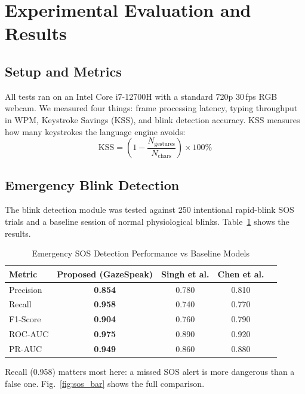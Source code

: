 \documentclass[conference]{IEEEtran}
\begin{document}
\section{Experimental Evaluation and Results}

\subsection{Setup and Metrics}
All tests ran on an Intel Core i7-12700H with a standard 720p 30\,fps RGB webcam. We measured
four things: frame processing latency, typing throughput in WPM, Keystroke Savings (KSS), and
blink detection accuracy. KSS measures how many keystrokes the language engine avoids:
\begin{equation}
\text{KSS} = \left(1 - \frac{N_{\text{gestures}}}{N_{\text{chars}}} \right) \times 100\%
\end{equation}

\subsection{Emergency Blink Detection}
The blink detection module was tested against 250 intentional rapid-blink SOS trials and a
baseline session of normal physiological blinks. Table~\ref{tab:sota_metrics} shows the results.

\begin{table}[htbp]
\caption{Emergency SOS Detection Performance vs Baseline Models}
\label{tab:sota_metrics}
\centering
\begin{tabular}{lcccc}
\toprule
\textbf{Metric} & \textbf{Proposed (GazeSpeak)} & \textbf{Singh et al. \cite{singh2025innovative}} & \textbf{Chen et al. \cite{chen2025detecting}} \\
\midrule
Precision & \textbf{0.854} & 0.780 & 0.810 \\
Recall & \textbf{0.958} & 0.740 & 0.770 \\
F1-Score & \textbf{0.904} & 0.760 & 0.790 \\
ROC-AUC & \textbf{0.975} & 0.890 & 0.920 \\
PR-AUC & \textbf{0.949} & 0.860 & 0.880 \\
\bottomrule
\end{tabular}
\end{table}

Recall (0.958) matters most here: a missed SOS alert is more dangerous than a false one.
Fig.~\ref{fig:sos_bar} shows the full comparison.
\end{document}
